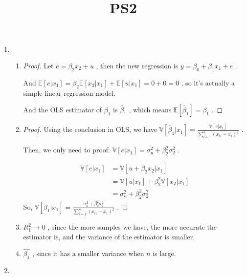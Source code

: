 \documentclass{article}
\title{PS2}
\begin{document}
\maketitle
\begin{enumerate}
    \item \begin{enumerate}
        \item \begin{proof}
            Let $e=\beta_2x_2+u$ , then the new regression is $y=\beta_0+\beta_1x_1+e$ . \par
            And $\mathbb{E}[e|x_1]=\beta_2\mathbb{E}[x_2|x_1]+\mathbb{E}[u|x_1]=0+0=0$ , 
            so it's actually a simple linear regression model. \par
            And the OLS estimator of $\beta_1$ is $\tilde{\beta_1}$ , which means $\mathbb{E}[\tilde{\beta_1}]=\beta_1$ .
        \end{proof}
        \item \begin{proof}
            Using the conclusion in OLS, we have $\mathbb{V}[\tilde{\beta_1}|x_1]=\frac{\mathbb{V}[e|x_1]}{\sum_{i=1}^{n}(x_{i1}-\overline{x_1})^2}$ . \par
            Then, we only need to proof: $\mathbb{V}[e|x_1]=\sigma_u^2+\beta_2^2\sigma_2^2$ . \par
            \begin{equation}
                \begin{aligned}
                    \mathbb{V}[e|x_1]
                    &=\mathbb{V}[u+\beta_2x_2|x_1] \\
                    &=\mathbb{V}[u|x_1]+\beta_2^2\mathbb{V}[x_2|x_1] \\
                    &=\sigma_u^2+\beta_2^2\sigma_2^2
                \end{aligned}
                \nonumber
            \end{equation}
            So, $\mathbb{V}[\tilde{\beta_1}|x_1]=\frac{\sigma_u^2+\beta_2^2\sigma_2^2}{\sum_{i=1}^{n}(x_{i1}-\overline{x_1})^2}$ .
        \end{proof}
        \item $R_1^2\rightarrow0$ , since the more samples we have, the more accurate the estimator is, and the variance of the estimator is smaller.
        \item $\hat{\beta_1}$ , since it has a smaller variance when $n$ is large.
    \end{enumerate}
    \item \begin{enumerate}

\end{enumerate}
\end{enumerate}
\end{document}
